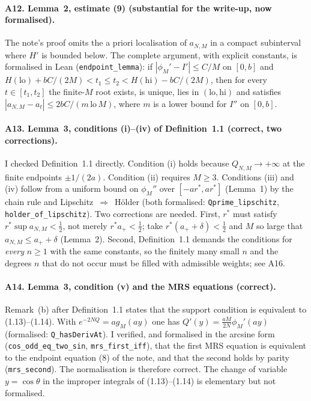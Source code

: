 \documentclass[11pt,a4paper]{article}
\theoremstyle{remark}
\numberwithin{equation}{section}
\begin{document}
\paragraph{A12. Lemma~2, estimate (9) (substantial for the write-up, now formalised).} The
note's proof omits the a priori localisation of $a_{N,M}$ in a compact subinterval where
$H'$ is bounded below. The complete argument, with explicit constants, is formalised in
Lean (\texttt{endpoint\_lemma}): if $|\phi_M'-I'|\le C/M$ on $[0,b]$ and
$H(\mathrm{lo})+bC/(2M)<t_1\le t_2<H(\mathrm{hi})-bC/(2M)$, then for every $t\in[t_1,t_2]$
the finite-$M$ root exists, is unique, lies in $(\mathrm{lo},\mathrm{hi})$ and satisfies
$|a_{N,M}-a_t|\le2bC/(m\,\mathrm{lo}\,M)$, where $m$ is a lower bound for $I''$ on $[0,b]$.

\paragraph{A13. Lemma~3, conditions (i)--(iv) of Definition~1.1 (correct, two
corrections).} I checked Definition~1.1 \cite[pp.~6--7]{levinlubinsky2018} directly.
Condition (i) holds because $Q_{N,M}\to+\infty$ at the finite endpoints $\pm1/(2a)$.
Condition (ii) requires $M\ge3$. Conditions (iii) and (iv) follow from a uniform bound on
$\phi_M''$ over $[-ar^*,ar^*]$ (Lemma~1) by the chain rule and Lipschitz~$\Rightarrow$~H\"older
(both formalised: \texttt{Qprime\_lipschitz}, \texttt{holder\_of\_lipschitz}). Two
corrections are needed. First, $r^*$ must satisfy $r^*\sup a_{N,M}<\frac12$, not merely
$r^*a_+<\frac12$; take $r^*(a_++\delta)<\frac12$ and $M$ so large that
$a_{N,M}\le a_++\delta$ (Lemma~2). Second, Definition~1.1 demands the conditions for
\emph{every} $n\ge1$ with the same constants, so the finitely many small $n$ and the degrees
$n$ that do not occur must be filled with admissible weights; see A16.

\paragraph{A14. Lemma~3, condition (v) and the MRS equations (correct).} Remark~(b) after
Definition~1.1 \cite[p.~6]{levinlubinsky2018} states that the support condition is
equivalent to (1.13)--(1.14). With
$e^{-2NQ}=ag_M(ay)$ one has $Q'(y)=\frac{aM}{2N}\phi_M'(ay)$ (formalised:
\texttt{Q\_hasDerivAt}). I verified, and formalised in the arcsine form
(\texttt{cos\_odd\_eq\_two\_sin}, \texttt{mrs\_first\_iff}), that the first MRS equation is
equivalent to the endpoint equation (8) of the note, and that the second holds by parity
(\texttt{mrs\_second}). The normalisation is therefore correct. The change of variable
$y=\cos\theta$ in the improper integrals of (1.13)--(1.14) is elementary but not formalised.
\end{document}
